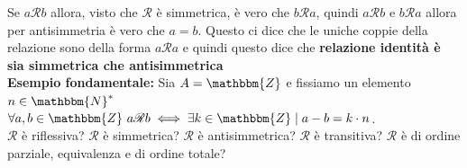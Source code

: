 \documentclass[12pt, letterpaper]{report}
\begin{document}
		Se $a \mathscr{R} b$ allora, visto che $\mathscr{R}$ è simmetrica, è vero che $b \mathscr{R} a$, quindi $a \mathscr{R} b$ e $b\mathscr{R}a$ allora per antisimmetria è vero che $a = b$. Questo ci dice che le uniche coppie della relazione sono della forma $a \mathscr{R} a$ e quindi questo dice che \textbf{relazione identità è sia simmetrica che antisimmetrica} \\
		\textbf{\color{red} Esempio fondamentale:} Sia $A = \mathbbm{Z}$ e fissiamo un elemento $n \in \mathbbm{N}^*$ \\
		$\forall a, b \in \mathbbm{Z}\ a \mathscr{R}b \iff \exists k \in \mathbbm{Z} \mid a - b = k \cdot n$. \\
		$\mathscr{R}$ è riflessiva? $\mathscr{R}$ è simmetrica? $\mathscr{R}$ è antisimmetrica? $\mathscr{R}$ è transitiva? $\mathscr{R}$ è di ordine parziale, equivalenza e di ordine totale?
\end{document}
